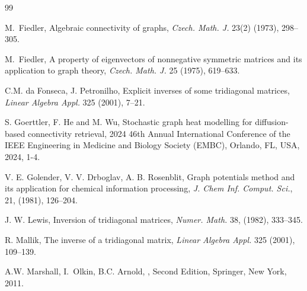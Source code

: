 \documentclass[12pt]{article}
\begin{document}
\begin{thebibliography}{99}

M.~Fiedler,  Algebraic connectivity of graphs,  {\em Czech. Math. J.}  23(2) (1973), 298--305.

 M.~Fiedler,  A property of eigenvectors of nonnegative symmetric matrices and its application to graph theory,  {\em Czech. Math. J.}  25 (1975), 619--633.


 C.M. da Fonseca, J. Petronilho, Explicit inverses of some tridiagonal matrices, {\em Linear Algebra Appl.} 325 (2001), 7--21.

 S. Goerttler, F. He and M. Wu, Stochastic graph heat modelling for diffusion-based connectivity retrieval, 2024 46th Annual International Conference of the IEEE Engineering in Medicine and Biology Society (EMBC), Orlando, FL, USA, 2024, 1-4.

 V. E. Golender, V. V. Drboglav, A. B. Rosenblit, Graph potentials
method and its application for chemical information processing, {\em J. Chem Inf.
Comput. Sci.}, 21, (1981), 126--204.





 J. W. Lewis,  Inversion of tridiagonal matrices, {\em Numer. Math.} 38, (1982), 333--345.


 R. Mallik, The inverse of a tridiagonal matrix, {\em Linear Algebra Appl.} 325 (2001), 109--139.


A.W. Marshall,  I.~Olkin, B.C. Arnold,
,
\newblock Second Edition, Springer, New York, 2011.


\end{thebibliography}
\end{document}
